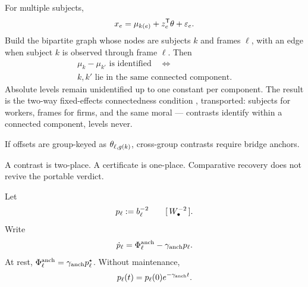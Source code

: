 \documentclass[../main]{subfiles}
\begin{document}
\begin{theorem}
  For multiple subjects,
  \begin{equation}
    x_e=\mu_{k(e)}+z_e\sp{\mathsf{T}}\theta+\varepsilon_e.
    \label{eq:recov:compare}
  \end{equation}
  Build the bipartite graph whose nodes are subjects $k$ and frames $\ell$, with an edge when
  subject $k$ is observed through frame $\ell$. Then
  \begin{equation}
    \boxed{
      \begin{gathered}
      \mu_k-\mu_{k'}\text{ is identified}
      \quad\Longleftrightarrow\quad\\
      k,k'\text{ lie in the same connected component}.
      \end{gathered}
    }
    \label{eq:recov:component}
  \end{equation}
  Absolute levels remain unidentified up to one constant per component.
  The result is the two-way fixed-effects connectedness condition
  \parencite{a:akm}, transported: subjects for workers, frames for firms, and the
  same moral --- contrasts identify within a connected component, levels never.
\end{theorem}

\begin{remark}
  If offsets are group-keyed as $\theta\sb{\ell,g(k)}$, cross-group contrasts require
  bridge anchors.
\end{remark}

\begin{remark}
  A contrast is two-place. A certificate is one-place. Comparative recovery does not revive
  the portable verdict.
\end{remark}

\begin{proposition}
  Let
  \begin{equation}
    \anchorprecision:=b\sb{\ell}\sp{-2}
    \qquad \dimpublicwelfareinvsq.
    \label{eq:recov:anchorprec}
  \end{equation}
  Write
  \begin{equation}
    \dot p_\ell=\anchorflux-\anchorlapse p_\ell.
    \label{eq:recov:anchorode}
  \end{equation}
  At rest, $\anchorflux=\anchorlapse p_\ell^\star$. Without maintenance,
  \begin{equation}
    p_\ell(t)=p_\ell(0)e^{-\gamma\sb{\mathrm{anch}} t}.
    \label{eq:recov:anchordecay}
  \end{equation}
\end{proposition}
\end{document}
